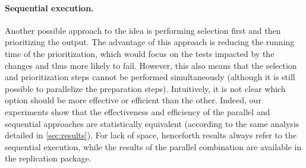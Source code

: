 %





\paragraph{Sequential execution.}
Another possible approach to the idea is performing selection first and then prioritizing the output.
The advantage of this approach is reducing the running time of the prioritization, which would focus on the tests impacted by the changes and thus more likely to fail.
However, this also means that the selection and prioritization steps cannot be performed simultaneously (although it is still possible to parallelize the preparation steps).
Intuitively, it is not clear which option should be more effective or efficient than the other.
Indeed, our experiments show that the effectiveness and efficiency of the parallel and sequential approaches are statistically equivalent (according to the same analysis detailed in \autoref{sec:results}).
For lack of space, henceforth \fz results always refer to the sequential execution, while the results of the parallel combination are available in the replication package.

